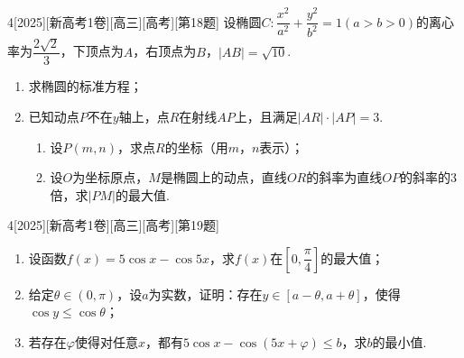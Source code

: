\begin{example}{4}[2025][新高考1卷][高三][高考][第18题]
设椭圆$C:\dfrac{x^2}{a^2}+\dfrac{y^2}{b^2}=1(a>b>0)$的离心率为$\dfrac{2\sqrt{2}}{3}$，下顶点为$A$，右顶点为$B$，$|AB|=\sqrt{10}$.
\begin{enumerate}
    \item 求椭圆的标准方程；
    \item 已知动点$P$不在$y$轴上，点$R$在射线$AP$上，且满足$|AR|\cdot|AP|=3$.
    \begin{enumerate}
        \item 设$P(m,n)$，求点$R$的坐标（用$m$，$n$表示）；
        \item 设$O$为坐标原点，$M$是椭圆上的动点，直线$OR$的斜率为直线$OP$的斜率的$3$倍，求$|PM|$的最大值.
    \end{enumerate}
\end{enumerate}
\end{example}

\begin{example}{4}[2025][新高考1卷][高三][高考][第19题]
\begin{enumerate}
    \item 设函数$f(x)=5\cos x-\cos5x$，求$f(x)$在$\left[0,\dfrac{\pi}{4}\right]$的最大值；
    \item 给定$\theta\in(0,\pi)$，设$a$为实数，证明：存在$y\in[a-\theta,a+\theta]$，使得$\cos y\le\cos\theta$；
    \item 若存在$\varphi$使得对任意$x$，都有$5\cos x-\cos(5x+\varphi)\le b$，求$b$的最小值.
\end{enumerate}
\end{example}